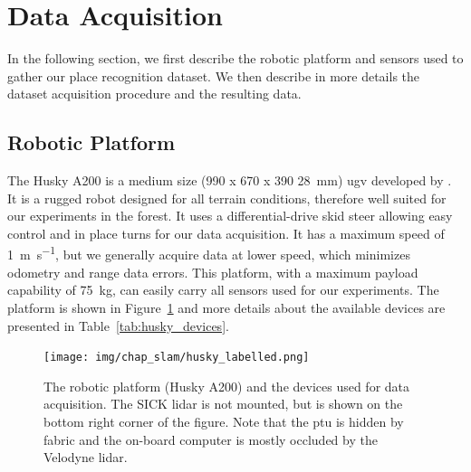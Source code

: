 \section{Data Acquisition}
\label{sec:chap_slam_data_acquisition}

In the following section, we first describe the robotic platform and sensors used to gather our place recognition dataset. We then describe in more details the dataset acquisition procedure and the resulting data.


\subsection{Robotic Platform}
\label{ssec:chap_slam_platform}

The Husky A200 is a medium size (990 x 670 x 390 \SI{28}{\milli\meter}) \gls*{ugv} developed by \cite{ClearpathWeb}. It is a rugged robot designed for all terrain conditions, therefore well suited for our experiments in the forest. It uses a differential-drive skid steer allowing easy control and in place turns for our data acquisition. It has a maximum speed of \SI{1}{\meter\per\second}, but we generally acquire data at lower speed, which minimizes odometry and range data errors. This platform, with a maximum payload capability of \SI{75}{\kilo\gram}, can easily carry all sensors used for our experiments. The platform is shown in Figure~\ref{fig:chap_slam_husky} and more details about the available devices are presented in Table~\ref{tab:husky_devices}.

\begin{figure}[H]
    \centering
    \texttt{[image: img/chap\_slam/husky\_labelled.png]}
    \caption{The robotic platform (Husky A200) and the devices used for data acquisition. The SICK \gls*{lidar} is not mounted, but is shown on the bottom right corner of the figure. Note that the \gls*{ptu} is hidden by fabric and the on-board computer is mostly occluded by the Velodyne \gls*{lidar}.}
    \label{fig:chap_slam_husky}
\end{figure}

